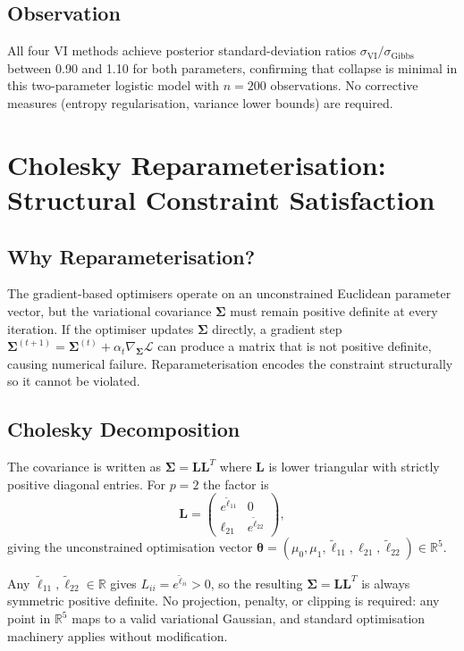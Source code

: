 \documentclass[11pt,a4paper]{article}
\newcommand{\R}{\mathbb{R}}
\begin{document}
\subsection*{Observation}

All four VI methods achieve posterior standard-deviation ratios
$\sigma_{\mathrm{VI}}/\sigma_{\mathrm{Gibbs}}$ between 0.90 and 1.10 for both
parameters, confirming that collapse is minimal in this two-parameter logistic model
with $n=200$ observations.
No corrective measures (entropy regularisation, variance lower bounds) are required.

\newpage
\section{Cholesky Reparameterisation: Structural Constraint Satisfaction}
\label{app:cholesky}

\subsection*{Why Reparameterisation?}

The gradient-based optimisers operate on an unconstrained Euclidean parameter vector,
but the variational covariance $\bm{\Sigma}$ must remain positive definite at every
iteration.
If the optimiser updates $\bm{\Sigma}$ directly, a gradient step
$\bm{\Sigma}^{(t+1)} = \bm{\Sigma}^{(t)} + \alpha_t\nabla_{\bm{\Sigma}}\mathcal{L}$
can produce a matrix that is not positive definite, causing numerical failure.
Reparameterisation encodes the constraint structurally so it cannot be violated.

\subsection*{Cholesky Decomposition}

The covariance is written as $\bm{\Sigma} = \bm{L}\bm{L}^T$ where $\bm{L}$ is lower
triangular with strictly positive diagonal entries.
For $p=2$ the factor is
\begin{equation}
  \bm{L} = \begin{pmatrix} e^{\tilde{\ell}_{11}} & 0 \\ \ell_{21} & e^{\tilde{\ell}_{22}} \end{pmatrix},
\end{equation}
giving the unconstrained optimisation vector
$\bm{\theta} = (\mu_0, \mu_1, \tilde{\ell}_{11}, \ell_{21}, \tilde{\ell}_{22}) \in \R^5$.

Any $\tilde{\ell}_{11}, \tilde{\ell}_{22} \in \R$ gives $L_{ii} = e^{\tilde{\ell}_{ii}} > 0$,
so the resulting $\bm{\Sigma} = \bm{L}\bm{L}^T$ is always symmetric positive definite.
No projection, penalty, or clipping is required: any point in $\R^5$ maps to a valid
variational Gaussian, and standard optimisation machinery applies without modification.
\end{document}
